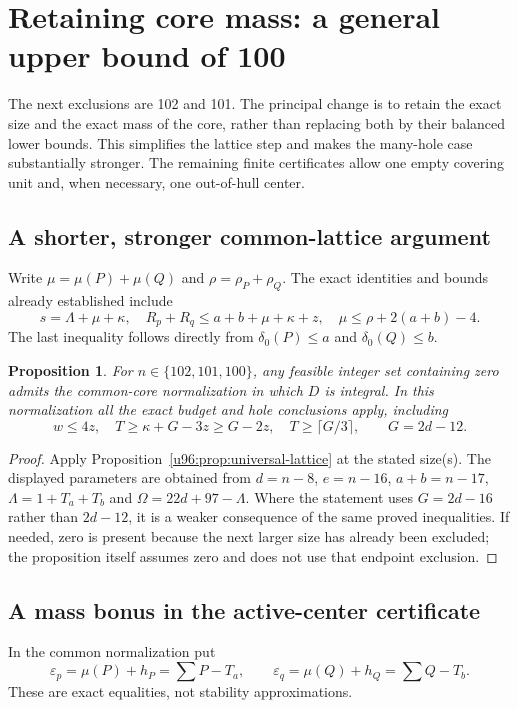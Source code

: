 \documentclass[11pt,a4paper]{article}
\newtheorem{proposition}[theorem]{Proposition}
\theoremstyle{remark}
\begin{document}
\section{Retaining core mass: a general upper bound of 100}\label{u96:sec:upper100}
The next exclusions are 102 and 101. The principal
change is to retain the exact size and the exact mass of the core, rather
than replacing both by their balanced lower bounds. This simplifies the
lattice step and makes the many-hole case substantially stronger. The
remaining finite certificates allow one empty covering unit and, when
necessary, one out-of-hull center.

\subsection{A shorter, stronger common-lattice argument}
Write $\mu=\mu(P)+\mu(Q)$ and $\rho=\rho_P+\rho_Q$.
The exact identities and bounds already established include
\begin{equation}
 s=\Lambda+\mu+\kappa,\quad
 R_p+R_q\leq a+b+\mu+\kappa+z,\quad
 \mu\leq\rho+2(a+b)-4.
 \label{u96:eq:retain-core}
\end{equation}
The last inequality follows directly from $\delta_0(P)\leq a$ and
$\delta_0(Q)\leq b$.

\begin{proposition}\label{u96:prop:lattice100}
For $n\in\{102,101,100\}$, any feasible integer set containing zero admits
the common-core normalization in which $D$ is integral. In this
normalization all the exact budget and hole conclusions apply, including
\[
 w\leq4z,\quad T\geq\kappa+G-3z\geq G-2z,\quad
 T\geq\lceil G/3\rceil,
 \qquad G=2d-12.
\]
\end{proposition}
\begin{proof}
Apply Proposition~\ref{u96:prop:universal-lattice} at the stated size(s).
The displayed parameters are obtained from $d=n-8$, $e=n-16$,
$a+b=n-17$, $\Lambda=1+T_a+T_b$ and $\Omega=22d+97-\Lambda$.
Where the statement uses $G=2d-16$ rather than $2d-12$, it is a weaker
consequence of the same proved inequalities. If needed, zero is present
because the next larger size has already been excluded; the proposition
itself assumes zero and does not use that endpoint exclusion.
\end{proof}


\subsection{A mass bonus in the active-center certificate}
In the common normalization put
\[
 \varepsilon_p=\mu(P)+h_P=\sum P-T_a,\qquad
 \varepsilon_q=\mu(Q)+h_Q=\sum Q-T_b.
\]
These are exact equalities, not stability approximations.
\end{document}
